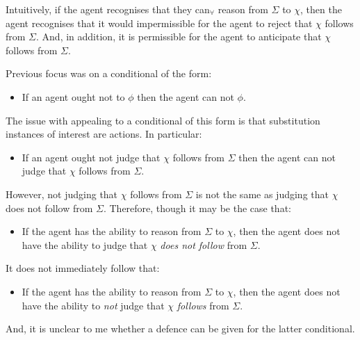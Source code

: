 \documentclass[10pt]{article}
\newcommand{\hozlinedash}[0]{%
  \noindent\hdashrule[0.5ex][c]{\textwidth}{.1pt}{2.5pt}
}
\begin{document}
Intuitively, if the agent recognises that they can\(_{\forall}\) reason from \(\Sigma\) to \(\chi\), then the agent recognises that it would impermissible for the agent to reject that \(\chi\) follows from \(\Sigma\).
And, in addition, it is permissible for the agent to anticipate that \(\chi\) follows from \(\Sigma\).

\hozlinedash

\newpage

Previous focus was on a conditional of the form:
\begin{itemize}
\item If an agent ought not to \(\phi\) then the agent can not \(\phi\).
\end{itemize}

The issue with appealing to a conditional of this form is that substitution instances of interest are actions.
In particular:

\begin{itemize}
\item If an agent ought not judge that \(\chi\) follows from \(\Sigma\) then the agent can not judge that \(\chi\) follows from \(\Sigma\).
\end{itemize}

However, not judging that \(\chi\) follows from \(\Sigma\) is not the same as judging that \(\chi\) does not follow from \(\Sigma\).
Therefore, though it may be the case that:
\begin{itemize}
\item If the agent has the ability to reason from \(\Sigma\) to \(\chi\), then the agent does not have the ability to judge that \(\chi\) \emph{does not follow} from \(\Sigma\).
\end{itemize}
It does not immediately follow that:
\begin{itemize}
\item If the agent has the ability to reason from \(\Sigma\) to \(\chi\), then the agent does not have the ability to \emph{not} judge that \(\chi\) \emph{follows} from \(\Sigma\).
\end{itemize}
And, it is unclear to me whether a defence can be given for the latter conditional.




\newpage

\printbibliography
\end{document}
